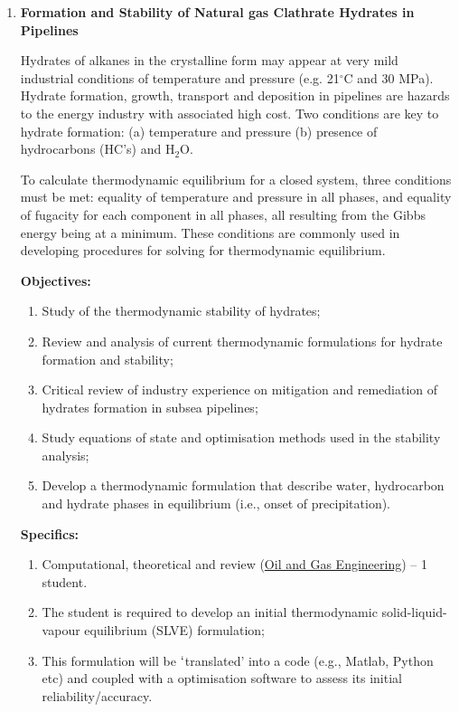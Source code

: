 \documentclass[12pts,a4paper,amsmath,amssymb,floatfix]{article}%
\begin{document}
\begin{enumerate}[label=\bfseries Project:]
\clearpage

\item {\bf Formation and Stability of Natural gas Clathrate Hydrates in Pipelines}

Hydrates of alkanes in the crystalline form may appear at very mild industrial conditions of temperature and pressure (e.g. 21$^{\circ}$C and 30 MPa).  Hydrate formation, growth, transport and deposition in pipelines are hazards to the energy industry with associated high cost. Two conditions are key to hydrate formation: (a) temperature and pressure (b) presence of hydrocarbons (HC's) and H$_{2}$O.

To calculate thermodynamic equilibrium for a closed system, three conditions must be met: equality of temperature and pressure in all phases, and equality of fugacity for each component in all phases, all resulting from the Gibbs energy being at a minimum. These conditions are commonly used in developing procedures for solving for thermodynamic equilibrium. 

\noindent
{\bf Objectives:}
\begin{enumerate}
\item Study of the thermodynamic stability of hydrates; 
\item Review and analysis of current thermodynamic formulations for hydrate formation and stability;
\item Critical review of industry experience on mitigation and remediation of hydrates formation in subsea pipelines; 
\item Study equations of state and optimisation methods used in the stability analysis;
\item Develop a thermodynamic formulation that describe water, hydrocarbon and hydrate phases in equilibrium (i.e., onset of precipitation).
\end{enumerate} 
 

\noindent
{\bf Specifics:} 
\begin{enumerate}
\item Computational, theoretical and review (\underline{Oil and Gas Engineering}) -- 1 student. 
\item The student is required to develop an initial thermodynamic solid-liquid-vapour equilibrium (SLVE) formulation;
\item This formulation will be $\lq$translated' into a code (e.g., Matlab, Python etc) and coupled with a optimisation software to assess its initial reliability/accuracy.
\end{enumerate}


\end{enumerate}
\end{document}
